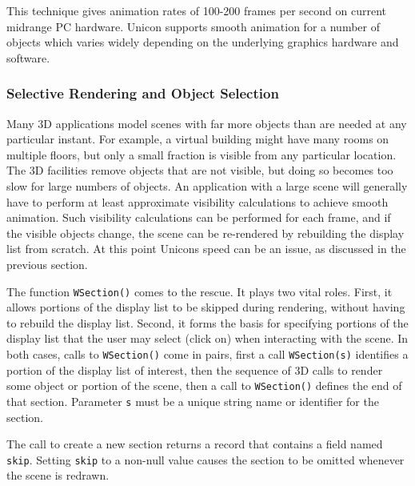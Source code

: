 
This technique gives animation rates of 100-200 frames per second on
current midrange PC hardware. Unicon supports smooth animation for a
number of objects which varies widely depending on the underlying
graphics hardware and software.

\subsubsection{Selective Rendering and Object Selection}

Many 3D applications model scenes with far more objects than are needed
at any particular instant. For example, a virtual building might have
many rooms on multiple floors, but only a small fraction is visible
from any particular location. The 3D facilities remove objects that are
not visible, but doing so becomes too slow for large numbers of
objects. An application with a large scene will generally have to
perform at least approximate visibility calculations to achieve smooth
animation. Such visibility calculations can be performed for each
frame, and if the visible objects change, the scene can be re-rendered
by rebuilding the display list from scratch. At this point
Unicon{\textquotesingle}s speed can be an issue, as discussed in the
previous section.

The function \texttt{WSection()} comes to the rescue. It plays two vital
roles. First, it allows portions of the display list to be skipped
during rendering, without having to rebuild the display list. Second,
it forms the basis for specifying portions of the display list that the
user may select (click on) when interacting with the scene. In both
cases, calls to \texttt{WSection()} come in pairs, first a call
\texttt{WSection(s)} identifies a portion of the display list of
interest, then the sequence of 3D calls to render some object or
portion of the scene, then a call to \texttt{WSection()} defines the
end of that section. Parameter \texttt{s} must be a unique string name
or identifier for the section.

The call to create a new section returns a record that contains a field
named \texttt{skip}. Setting \texttt{skip} to a non-null value causes the
section to be omitted whenever the scene is redrawn.

